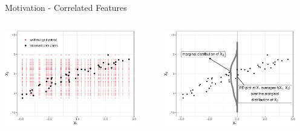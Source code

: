 \documentclass[10pt,compress,t,notes=noshow, xcolor=table]{beamer}
\begin{document}
\begin{frame}{Motivation - Correlated Features}

\begin{columns}[T, totalwidth=\textwidth]
\begin{column}{0.5\textwidth}
\centering
\includegraphics[width=0.9\textwidth]{figure/ale_scatter_grid}
\end{column}
\begin{column}{0.5\textwidth}
\centering
\includegraphics[width=0.9\textwidth]{figure/ale_pdplot}
\end{column}
\end{columns}




\end{frame}
\end{document}
